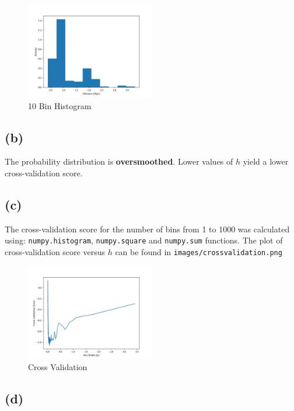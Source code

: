 \begin{figure}[H]
  \centering
  \includegraphics[width=0.5\textwidth]{assets/images/10binhistogram.png}
  \caption{10 Bin Histogram}
\end{figure}


\subsection*{(b)}

The probability distribution is \textbf{oversmoothed}. Lower values of $h$ yield
a lower cross-validation score.

\subsection*{(c)}

The cross-validation score for the number of bins from 1 to 1000 was calculated
using: \texttt{numpy.histogram}, \texttt{numpy.square} and \texttt{numpy.sum}
functions. The plot of cross-validation score versus $h$ can be found in
\texttt{images/crossvalidation.png}

\begin{figure}[H]
  \centering
  \includegraphics[width=0.5\textwidth]{assets/images/crossvalidation.png}
  \caption{Cross Validation}
\end{figure}

\subsection*{(d)}

